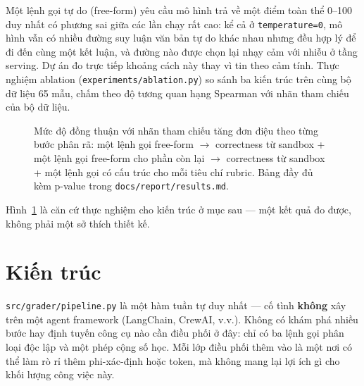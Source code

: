 \documentclass[11pt,a4paper]{article}
\begin{document}
Một lệnh gọi tự do (free-form) yêu cầu mô hình trả về một điểm toàn thể
0--100 duy nhất có phương sai giữa các lần chạy rất cao: kể cả ở
\texttt{temperature=0}, mô hình vẫn có nhiều đường suy luận văn bản tự do
khác nhau nhưng đều hợp lý để đi đến cùng một kết luận, và đường nào được
chọn lại nhạy cảm với nhiễu ở tầng serving. Dự án đo trực tiếp khoảng cách
này thay vì tin theo cảm tính. Thực nghiệm ablation
(\texttt{experiments/ablation.py}) so sánh ba kiến trúc trên cùng bộ dữ
liệu 65 mẫu, chấm theo độ tương quan hạng Spearman với nhãn tham chiếu của
bộ dữ liệu.

\begin{figure}[htbp]
\centering
{}
\caption{Mức độ đồng thuận với nhãn tham chiếu tăng đơn điệu theo từng bước
phân rã: một lệnh gọi free-form
$\rightarrow$ correctness từ sandbox + một lệnh gọi free-form cho phần còn
lại
$\rightarrow$ correctness từ sandbox + một lệnh gọi có cấu trúc cho mỗi
tiêu chí rubric. Bảng đầy đủ kèm p-value trong \texttt{docs/report/results.md}.}
\label{fig:ablation-bar}
\end{figure}

Hình~\ref{fig:ablation-bar} là căn cứ thực nghiệm cho kiến trúc ở mục sau —
một kết quả đo được, không phải một sở thích thiết kế.

\section{Kiến trúc}

\texttt{src/grader/pipeline.py} là một hàm tuần tự duy nhất — cố tình
\textbf{không} xây trên một agent framework (LangChain, CrewAI, v.v.).
Không có khám phá nhiều bước hay định tuyến công cụ nào cần điều phối ở
đây: chỉ có ba lệnh gọi phân loại độc lập và một phép cộng số học. Mỗi lớp
điều phối thêm vào là một nơi có thể làm rò rỉ thêm phi-xác-định hoặc
token, mà không mang lại lợi ích gì cho khối lượng công việc này.
\end{document}
